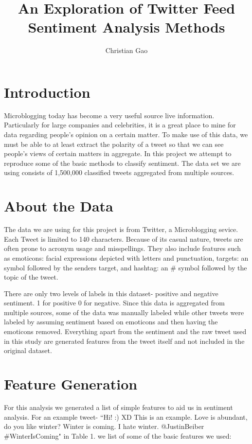 \documentclass[twocolumn,11pt]{asme2ej}
\title{An Exploration of Twitter Feed Sentiment Analysis Methods}
\author{Christian Gao
    \affiliation{
	Student
	Department of Statistics\\
	University of California\\
	Los Angeles, California 95616\\
    Email: christiansgao@ucla.edu
    }	
}
\begin{document}


\maketitle    

\section{Introduction}

Microblogging today has become a very useful source live information. Particularly for large companies and celebrities, it is a great place to mine for data regarding people's opinion on a certain matter. To make use of this data, we must be able to at least extract the polarity of a tweet so that we can see people's views of certain matters in aggregate. In this project we attempt to reproduce some of the basic methods to classify sentiment. The data set we are using consists of 1,500,000 classified tweets aggregated from multiple sources.
\section{About the Data}

The data we are using for this project is from Twitter, a Microblogging sevice. Each Tweet is limited to 140 characters. Because of its casual nature, tweets are often prone to acronym usage and misspellings. They also include features such as emoticons: facial expressions depicted with letters and punctuation, targets: an \@ symbol followed by the senders target, and hashtag: an \# symbol followed by the topic of the tweet.

There are only two levels of labels in this dataset- positive and negative sentiment. 1 for positive 0 for negative. Since this data is aggregated from multiple sources, some of the data was manually labeled while other tweets were labeled by assuming sentiment based on emoticons and then having the emoticons removed. Everything apart from the sentiment and the raw tweet used in this study are generated features from the tweet itself and not included in the original dataset.

\section{Feature Generation}

For this analysis we generated a list of simple features to aid us in sentiment analysis. For an example tweet- ``Hi! :) XD This is an example. Love is abundant, do you like winter? Winter is coming. I hate winter. @JustinBeiber \#WinterIsComing" in Table 1. we list of some of the basic features we used: 
\end{document}
